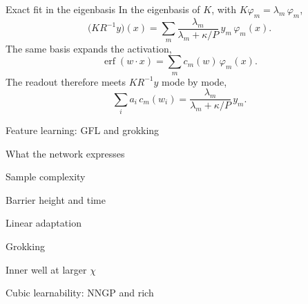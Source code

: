 \documentclass[aspectratio=169]{beamer}
\begin{document}
\begin{frame}{Exact fit in the eigenbasis}
  In the eigenbasis of \(K\), with \(K\varphi_m=\lambda_m\,\varphi_m\),
  \begin{equation*}
    \bigl(KR^{-1}y\bigr)(x)
    =
    \sum_m
    \frac{\lambda_m}{\lambda_m+\kappa/P}
    \,
    y_m\,
    \varphi_m(x).
  \end{equation*}
  The same basis expands the activation,
  \begin{equation*}
    \operatorname{erf}(w\cdot x)
    =
    \sum_m
    c_m(w)\,
    \varphi_m(x).
  \end{equation*}
  The readout therefore meets \(KR^{-1}y\) mode by mode,
  \begin{equation*}
    \sum_i a_i\, c_m(w_i)
    =
    \frac{\lambda_m}{\lambda_m+\kappa/P}
    \,
    y_m.
  \end{equation*}
\end{frame}

\begin{frame}{Feature learning: GFL and grokking}
\end{frame}

\begin{frame}{What the network expresses}
\end{frame}

\begin{frame}{Sample complexity}
\end{frame}

\begin{frame}{Barrier height and time}
\end{frame}

\begin{frame}{Linear adaptation}
\end{frame}

\begin{frame}{Grokking}
\end{frame}

\begin{frame}{Inner well at larger $\chi$}
\end{frame}

\begin{frame}{Cubic learnability: NNGP and rich}
\end{frame}
\end{document}
